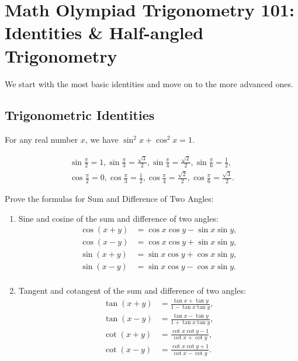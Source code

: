 \section{Math Olympiad Trigonometry 101:\\ Identities \& Half-angled Trigonometry}
We start with the most basic identities and move on to the more advanced ones.
\subsection{Trigonometric Identities}

\begin{identity}
    For any real number $x$, we have $\sin^2 x + \cos^2 x = 1$.
\end{identity}

\begin{identity}
\begin{align}
    \sin \frac{\pi}2 = 1,  \sin \frac{\pi}3 = \frac{\sqrt 3}{2}, \sin \frac{\pi}4 = \frac{\sqrt 2}{2}, \sin \frac{\pi}{6} = \frac 12,\\
    \cos \frac{\pi}2 = 0,  \cos \frac{\pi}3 = \frac{1}{2}, \cos \frac{\pi}4 = \frac{\sqrt 2}{2}, \cos \frac{\pi}{6} = \frac{\sqrt 3}2.
\end{align}
\end{identity}


\begin{identity}Prove the formulas for Sum and Difference of Two Angles:
\begin{enumerate}
    \item Sine and cosine of the sum and difference of two angles:
    \begin{align}
        \cos(x+y) &= \cos x \cos y - \sin x \sin y,\label{id:1}\\
        \cos(x-y) &= \cos x \cos y + \sin x \sin y,\label{id:2}\\
        \sin(x+y) &= \sin x \cos y + \cos x \sin y,\label{id:3}\\
        \sin(x-y) &= \sin x \cos y - \cos x \sin y.\label{id:4}\\
    \end{align}
    \item Tangent and cotangent of the sum and difference of two angles:
    \begin{align}
        \tan(x+y) &= \frac{\tan x + \tan y}{1 - \tan x \tan y},\label{id:t1}\\
        \tan(x-y) &= \frac{\tan x - \tan y}{1 + \tan x \tan y},\label{id:t2}\\
        \cot(x+y) &= \frac{\cot x \cot y - 1}{\cot x + \cot y},\label{id:t3}\\
        \cot(x-y) &= \frac{\cot x \cot y + 1}{\cot x - \cot y}.\label{id:t4}\\
    \end{align}
\end{enumerate}
\end{identity}



